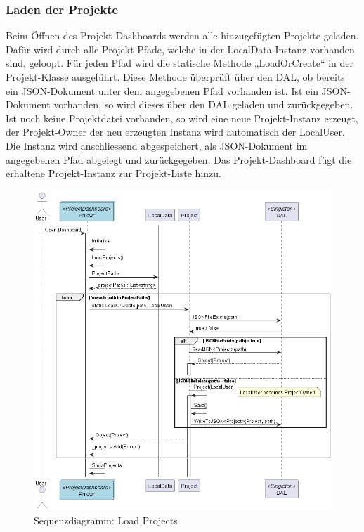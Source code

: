 \subsubsection{Laden der Projekte}
Beim Öffnen des Projekt-Dashboards werden alle hinzugefügten Projekte geladen.\\
Dafür wird durch alle Projekt-Pfade, welche in der LocalData-Instanz vorhanden sind, geloopt. Für jeden Pfad wird die statische Methode „LoadOrCreate“ in der Projekt-Klasse ausgeführt.
Diese Methode überprüft über den DAL, ob bereits ein JSON-Dokument unter dem angegebenen Pfad vorhanden ist.
Ist ein JSON-Dokument vorhanden, so wird dieses über den DAL geladen und zurückgegeben. Ist noch keine Projektdatei vorhanden, so wird eine neue Projekt-Instanz erzeugt, 
der Projekt-Owner der neu erzeugten Instanz wird automatisch der LocalUser. Die Instanz wird anschliessend abgespeichert, als JSON-Dokument im angegebenen Pfad abgelegt und zurückgegeben.
Das Projekt-Dashboard fügt die erhaltene Projekt-Instanz zur Projekt-Liste hinzu.
\begin{figure}[H]
  \begin{center}
    \includegraphics[width=0.7\linewidth]{../content/diagrams/sequence/loadProjectsSequence/loadProjectsSequence.png}
    \caption{Sequenzdiagramm: Load Projects}
  \end{center}
\end{figure}
\newpage

